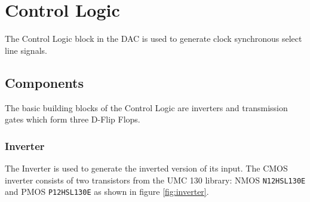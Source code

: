 \documentclass[parskip,oneside,colorbacktitle,10pt,accentcolor=tud1b,table]{tudreport}
\begin{document}
{\chapter{Control Logic}

The Control Logic block in the DAC is used to generate clock synchronous select line signals.

\section{Components}

The basic building blocks of the Control Logic are inverters and transmission gates which form three D-Flip Flops.

\subsection{Inverter}

The Inverter is used to generate the inverted version of its input. The CMOS inverter consists of two transistors from the UMC 130 library: NMOS \texttt{N12HSL130E} and PMOS \texttt{P12HSL130E} as shown in figure \ref{fig:inverter}. 

}
\end{document}
